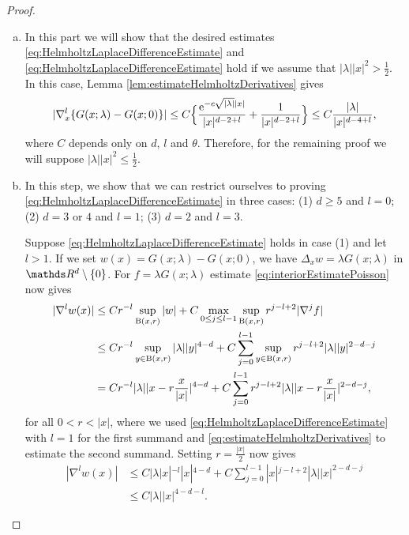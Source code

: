 \begin{proof}
  \begin{enumerate}[(a)]
    \item In this part we will show that the desired estimates \eqref{eq:HelmholtzLaplaceDifferenceEstimate} and \eqref{eq:HelmholtzLaplaceDifferenceEstimate} hold if we assume that $|\lambda| |x|^2 > \frac{1}{2}$.
    In this case, Lemma \ref{lem:estimateHelmholtzDerivatives} gives
    \begin{align*}
      |\nabla_x^l \{ G(x; \lambda) - G(x; 0) \} |
      \leq C \Big\{ \frac{\mathrm{e}^{-c \sqrt{|\lambda|} |x|}}{|x|^{d - 2 + l}} + \frac{1}{|x|^{d - 2 + l}} \Big\} \leq C \frac{|\lambda|}{|x|^{d - 4 + l}},
    \end{align*}
    where $C$ depends only on $d$, $l$ and $\theta$.
    Therefore, for the remaining proof we will suppose $|\lambda||x|^2 \leq \frac{1}{2}$.
  \item In this step, we show that we can restrict ourselves to proving \eqref{eq:HelmholtzLaplaceDifferenceEstimate} in three cases: (1) $d \geq 5$ and $l = 0$; (2) $d = 3$ or $4$ and $l = 1$; (3) $d = 2$ and $l = 3$.
    
    Suppose \eqref{eq:HelmholtzLaplaceDifferenceEstimate} holds in case (1) and let $l > 1$.
    If we set $ w(x) = G(x;\lambda) - G(x;0) $, we have $\Delta_x w = \lambda G(x; \lambda)$ in $\R^d \setminus \{0\}$.
    For $f = \lambda G(x; \lambda)$ estimate \eqref{eq:interiorEstimatePoisson} now gives
    \begin{align*}
      |\nabla^l w(x) |
      &\leq C r^{-l} \sup_{\mathrm{B}(x,r)} |w| + C \max_{0 \leq j \leq l - 1} \sup_{\mathrm{B}(x,r)} r^{j - l + 2} |\nabla^j f| \\
      &\leq C r^{-l} \sup_{y \in \mathrm{B}(x,r)} |\lambda| |y|^{4 - d} + C \sum_{j = 0}^{l - 1} \sup_{y \in \mathrm{B}(x,r)} r^{j - l + 2} |\lambda| |y|^{2 - d - j} \\
      &= C r^{-l} |\lambda| |x - r \frac{x}{|x|} |^{4 - d} + C \sum_{j = 0}^{l - 1} r^{j - l + 2} |\lambda| |x - r \frac{x}{|x|} |^{2 - d - j},
    \end{align*}
    for all $0 < r < |x|$, where we used \eqref{eq:HelmholtzLaplaceDifferenceEstimate} with $l = 1$ for the first summand and \eqref{eq:estimateHelmholtzDerivatives} to estimate the second summand.
    Setting $r = \frac{|x|}{2}$ now gives
    \begin{align*}
      |\nabla^l w(x)| 
      &\leq C |\lambda |x|^{-l} |x|^{4 - d} + C \sum_{j = 0}^{l - 1} |x|^{j - l + 2} |\lambda| |x|^{2 - d - j} \\
      &\leq C |\lambda| |x|^{4 - d - l}.
    \end{align*}


\end{enumerate}
\end{proof}
